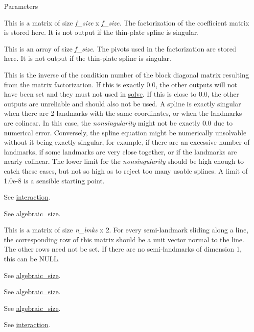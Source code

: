 \begin{DoxyParams}{Parameters}
\item[\mbox{\tt[out]} {\em F}]This is a matrix of size {\itshape f\_\-size\/} x {\itshape f\_\-size\/}. The factorization of the coefficient matrix is stored here. It is not output if the thin-\/plate spline is singular. \item[\mbox{\tt[out]} {\em pivots}]This is an array of size {\itshape f\_\-size\/}. The pivots used in the factorization are stored here. It is not output if the thin-\/plate spline is singular. \item[\mbox{\tt[out]} {\em nonsingularity}]This is the inverse of the condition number of the block diagonal matrix resulting from the matrix factorization. If this is exactly 0.0, the other outputs will not have been set and they must not used in \hyperlink{classew_1_1Tps2_a4691d5181d87c9219d8fec679cfccdcc}{solve}. If this is close to 0.0, the other outputs are unreliable and should also not be used. A spline is exactly singular when there are 2 landmarks with the same coordinates, or when the landmarks are colinear. In this case, the {\itshape nonsingularity\/} might not be exactly 0.0 due to numerical error. Conversely, the spline equation might be numerically unsolvable without it being exactly singular, for example, if there are an excessive number of landmarks, if some landmarks are very close together, or if the landmarks are nearly colinear. The lower limit for the {\itshape nonsingularity\/} should be high enough to catch these cases, but not so high as to reject too many usable splines. A limit of {\ttfamily 1.0e-\/8} is a sensible starting point. \item[\mbox{\tt[in]} {\em L}]See \hyperlink{classew_1_1Tps2_a7f04e98fa574f821257e904658b2bb8b}{interaction}. \item[\mbox{\tt[in]} {\em relax\_\-dims\_\-opt}]See \hyperlink{classew_1_1Tps2_a448c7039e42cb7fad800461bacc48c72}{algebraic\_\-size}. \item[\mbox{\tt[in]} {\em relax\_\-params\_\-opt}]This is a matrix of size {\itshape n\_\-lmks\/} x 2. For every semi-\/landmark sliding along a line, the corresponding row of this matrix should be a unit vector normal to the line. The other rows need not be set. If there are no semi-\/landmarks of dimension 1, this can be {\ttfamily NULL}. \item[\mbox{\tt[in]} {\em f\_\-size}]See \hyperlink{classew_1_1Tps2_a448c7039e42cb7fad800461bacc48c72}{algebraic\_\-size}. \item[\mbox{\tt[in]} {\em is\_\-mixed}]See \hyperlink{classew_1_1Tps2_a448c7039e42cb7fad800461bacc48c72}{algebraic\_\-size}. \item[\mbox{\tt[in]} {\em is\_\-reduced}]See \hyperlink{classew_1_1Tps2_a448c7039e42cb7fad800461bacc48c72}{algebraic\_\-size}. \item[\mbox{\tt[in]} {\em n\_\-lmks}]See \hyperlink{classew_1_1Tps2_a7f04e98fa574f821257e904658b2bb8b}{interaction}. \end{DoxyParams}

